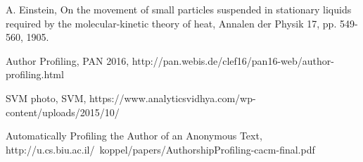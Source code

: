 \documentclass{llncs}
\begin{document}
\newpage

\begin{thebibliography}{1}

A. Einstein, On the movement of small particles suspended in stationary liquids required by the molecular-kinetic theory of heat, Annalen der Physik 17, pp. 549-560, 1905.


Author Profiling, PAN 2016, http://pan.webis.de/clef16/pan16-web/author-profiling.html

SVM photo, SVM, https://www.analyticsvidhya.com/wp-content/uploads/2015/10/

Automatically Profiling the Author of an Anonymous Text, http://u.cs.biu.ac.il/~koppel/papers/AuthorshipProfiling-cacm-final.pdf


\end{thebibliography}
\end{document}
